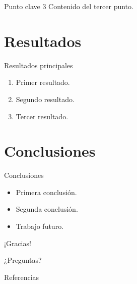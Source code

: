 \documentclass[aspectratio=169, 12pt]{beamer}
\begin{document}
\begin{frame}{Punto clave 3}
  Contenido del tercer punto.

\end{frame}

\section{Resultados}

\begin{frame}{Resultados principales}
  \begin{enumerate}
    \item Primer resultado.
    \item Segundo resultado.
    \item Tercer resultado.
  \end{enumerate}
\end{frame}

\section{Conclusiones}

\begin{frame}{Conclusiones}
  \begin{itemize}
    \item Primera conclusión.
    \item Segunda conclusión.
    \item Trabajo futuro.
  \end{itemize}
\end{frame}

\begin{frame}[standout]
  ¡Gracias!

  \vspace{1cm}
  {\small ¿Preguntas?}
\end{frame}

\appendix
\begin{frame}[allowframebreaks]{Referencias}
  \printbibliography
\end{frame}
\end{document}
